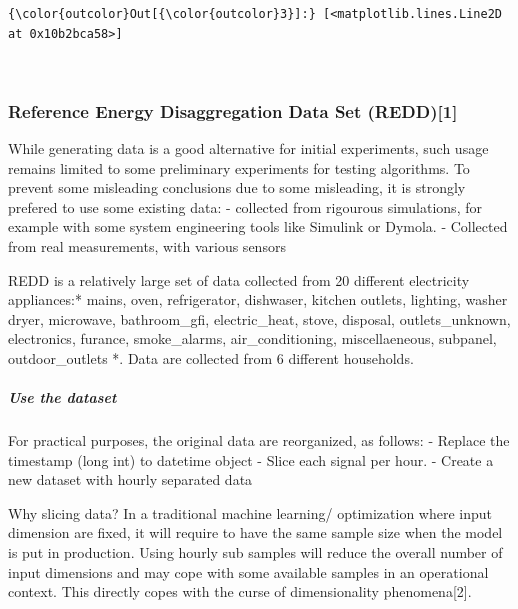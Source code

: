 \documentclass{article}
\begin{document}
            \begin{Verbatim}[commandchars=\\\{\}]
{\color{outcolor}Out[{\color{outcolor}3}]:} [<matplotlib.lines.Line2D at 0x10b2bca58>]
\end{Verbatim}
        
    \begin{center}
    \end{center}
    { \hspace*{\fill} \\}
    
    \subsubsection{Reference Energy Disaggregation Data Set
(REDD){[}1{]}}\label{reference-energy-disaggregation-data-set-redd1}

While generating data is a good alternative for initial experiments,
such usage remains limited to some preliminary experiments for testing
algorithms. To prevent some misleading conclusions due to some
misleading, it is strongly prefered to use some existing data: -
collected from rigourous simulations, for example with some system
engineering tools like Simulink or Dymola. - Collected from real
measurements, with various sensors

REDD is a relatively large set of data collected from 20 different
electricity appliances:* mains, oven, refrigerator, dishwaser, kitchen
outlets, lighting, washer dryer, microwave, bathroom\_gfi,
electric\_heat, stove, disposal, outlets\_unknown, electronics, furance,
smoke\_alarms, air\_conditioning, miscellaeneous, subpanel,
outdoor\_outlets *. Data are collected from 6 different households.

\subparagraph{Use the dataset}\label{use-the-dataset}

For practical purposes, the original data are reorganized, as follows: -
Replace the timestamp (long int) to datetime object - Slice each signal
per hour. - Create a new dataset with hourly separated data

{Why slicing data?} In a traditional machine learning/ optimization
where input dimension are fixed, it will require to have the same sample
size when the model is put in production. Using hourly sub samples will
reduce the overall number of input dimensions and may cope with some
available samples in an operational context. This directly copes with
the curse of dimensionality phenomena{[}2{]}.
\end{document}
